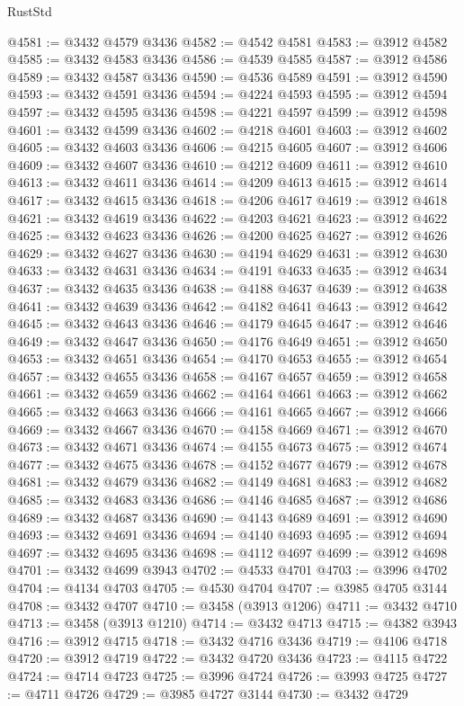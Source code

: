 \begin{lexlean}{RustStd}
\begin{coremodule}
@4581 := @3432 @4579 @3436
@4582 := @4542 @4581
@4583 := @3912 @4582
@4585 := @3432 @4583 @3436
@4586 := @4539 @4585
@4587 := @3912 @4586
@4589 := @3432 @4587 @3436
@4590 := @4536 @4589
@4591 := @3912 @4590
@4593 := @3432 @4591 @3436
@4594 := @4224 @4593
@4595 := @3912 @4594
@4597 := @3432 @4595 @3436
@4598 := @4221 @4597
@4599 := @3912 @4598
@4601 := @3432 @4599 @3436
@4602 := @4218 @4601
@4603 := @3912 @4602
@4605 := @3432 @4603 @3436
@4606 := @4215 @4605
@4607 := @3912 @4606
@4609 := @3432 @4607 @3436
@4610 := @4212 @4609
@4611 := @3912 @4610
@4613 := @3432 @4611 @3436
@4614 := @4209 @4613
@4615 := @3912 @4614
@4617 := @3432 @4615 @3436
@4618 := @4206 @4617
@4619 := @3912 @4618
@4621 := @3432 @4619 @3436
@4622 := @4203 @4621
@4623 := @3912 @4622
@4625 := @3432 @4623 @3436
@4626 := @4200 @4625
@4627 := @3912 @4626
@4629 := @3432 @4627 @3436
@4630 := @4194 @4629
@4631 := @3912 @4630
@4633 := @3432 @4631 @3436
@4634 := @4191 @4633
@4635 := @3912 @4634
@4637 := @3432 @4635 @3436
@4638 := @4188 @4637
@4639 := @3912 @4638
@4641 := @3432 @4639 @3436
@4642 := @4182 @4641
@4643 := @3912 @4642
@4645 := @3432 @4643 @3436
@4646 := @4179 @4645
@4647 := @3912 @4646
@4649 := @3432 @4647 @3436
@4650 := @4176 @4649
@4651 := @3912 @4650
@4653 := @3432 @4651 @3436
@4654 := @4170 @4653
@4655 := @3912 @4654
@4657 := @3432 @4655 @3436
@4658 := @4167 @4657
@4659 := @3912 @4658
@4661 := @3432 @4659 @3436
@4662 := @4164 @4661
@4663 := @3912 @4662
@4665 := @3432 @4663 @3436
@4666 := @4161 @4665
@4667 := @3912 @4666
@4669 := @3432 @4667 @3436
@4670 := @4158 @4669
@4671 := @3912 @4670
@4673 := @3432 @4671 @3436
@4674 := @4155 @4673
@4675 := @3912 @4674
@4677 := @3432 @4675 @3436
@4678 := @4152 @4677
@4679 := @3912 @4678
@4681 := @3432 @4679 @3436
@4682 := @4149 @4681
@4683 := @3912 @4682
@4685 := @3432 @4683 @3436
@4686 := @4146 @4685
@4687 := @3912 @4686
@4689 := @3432 @4687 @3436
@4690 := @4143 @4689
@4691 := @3912 @4690
@4693 := @3432 @4691 @3436
@4694 := @4140 @4693
@4695 := @3912 @4694
@4697 := @3432 @4695 @3436
@4698 := @4112 @4697
@4699 := @3912 @4698
@4701 := @3432 @4699 @3943
@4702 := @4533 @4701
@4703 := @3996 @4702
@4704 := @4134 @4703
@4705 := @4530 @4704
@4707 := @3985 @4705 @3144
@4708 := @3432 @4707
@4710 := @3458 (@3913 @1206)
@4711 := @3432 @4710
@4713 := @3458 (@3913 @1210)
@4714 := @3432 @4713
@4715 := @4382 @3943
@4716 := @3912 @4715
@4718 := @3432 @4716 @3436
@4719 := @4106 @4718
@4720 := @3912 @4719
@4722 := @3432 @4720 @3436
@4723 := @4115 @4722
@4724 := @4714 @4723
@4725 := @3996 @4724
@4726 := @3993 @4725
@4727 := @4711 @4726
@4729 := @3985 @4727 @3144
@4730 := @3432 @4729

\end{coremodule}
\end{lexlean}

